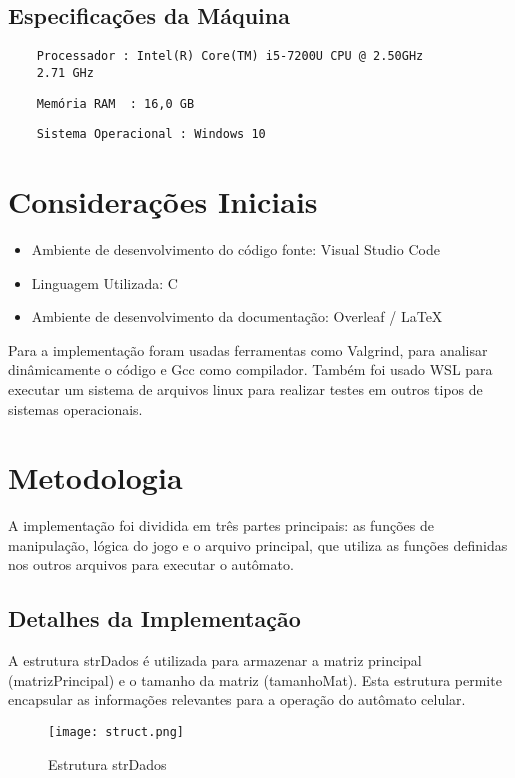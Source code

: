 \documentclass[a4paper,12pt]{article}
\begin{document}
\subsection{Especificações da Máquina}

\begin{verbatim}
    Processador : Intel(R) Core(TM) i5-7200U CPU @ 2.50GHz 
    2.71 GHz
\end{verbatim}
\begin{verbatim}
    Memória RAM  : 16,0 GB 
\end{verbatim}
\begin{verbatim}
    Sistema Operacional : Windows 10 
\end{verbatim}
\section{Considerações Iniciais}
\begin{itemize}
    \item Ambiente de desenvolvimento do código fonte: Visual Studio Code
    \item Linguagem Utilizada: C
    \item Ambiente de desenvolvimento da documentação: Overleaf / LaTeX
\end{itemize}
Para a implementação foram usadas ferramentas como Valgrind, para analisar dinâmicamente o código e Gcc como compilador. Também foi usado WSL para executar um sistema de arquivos linux para realizar testes em outros tipos de sistemas operacionais.

\section{Metodologia}
A implementação foi dividida em três partes principais: as funções de manipulação, lógica do jogo e o arquivo principal, que utiliza as funções definidas nos outros arquivos para executar o autômato.

\subsection{Detalhes da Implementação}

A estrutura strDados é utilizada para armazenar a matriz principal (matrizPrincipal) e o tamanho da matriz (tamanhoMat). Esta estrutura permite encapsular as informações relevantes para a operação do autômato celular.

    \begin{figure}[H]
        \centering
        \texttt{[image: struct.png]}
        \caption{Estrutura strDados}
        \label{fig:enter-label}
    \end{figure}
\end{document}
